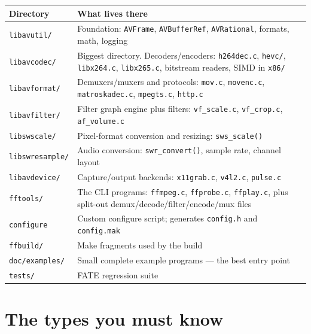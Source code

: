 \documentclass[11pt]{article}
\begin{document}
\begin{center}
\begin{tabular}{@{}p{} p{}@{}}
\hline
\textbf{Directory} & \textbf{What lives there} \\
\hline
\verb|libavutil/|    & Foundation: \verb|AVFrame|, \verb|AVBufferRef|, \verb|AVRational|, formats, math, logging \\
\verb|libavcodec/|   & Biggest directory. Decoders/encoders: \verb|h264dec.c|, \verb|hevc/|, \verb|libx264.c|, \verb|libx265.c|, bitstream readers, SIMD in \verb|x86/| \\
\verb|libavformat/|  & Demuxers/muxers and protocols: \verb|mov.c|, \verb|movenc.c|, \verb|matroskadec.c|, \verb|mpegts.c|, \verb|http.c| \\
\verb|libavfilter/|  & Filter graph engine plus filters: \verb|vf_scale.c|, \verb|vf_crop.c|, \verb|af_volume.c| \\
\verb|libswscale/|   & Pixel-format conversion and resizing: \verb|sws_scale()| \\
\verb|libswresample/|& Audio conversion: \verb|swr_convert()|, sample rate, channel layout \\
\verb|libavdevice/|  & Capture/output backends: \verb|x11grab.c|, \verb|v4l2.c|, \verb|pulse.c| \\
\verb|fftools/|      & The CLI programs: \verb|ffmpeg.c|, \verb|ffprobe.c|, \verb|ffplay.c|, plus split-out demux/decode/filter/encode/mux files \\
\verb|configure|     & Custom configure script; generates \verb|config.h| and \verb|config.mak| \\
\verb|ffbuild/|      & Make fragments used by the build \\
\verb|doc/examples/| & Small complete example programs --- the best entry point \\
\verb|tests/|        & FATE regression suite \\
\hline
\end{tabular}
\end{center}

\section{The types you must know}

\bigskip
\end{document}
